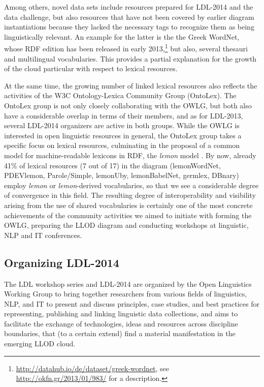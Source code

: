 Among others, novel data sets include resources prepared for LDL-2014 and the data challenge, but also resources that have not been covered by earlier diagram instantiations because they lacked the necessary tags to recognize them as being linguistically relevant. An example for the latter is the the Greek WordNet, whose RDF edition has been released in early 2013,\footnote{
	\url{http://datahub.io/de/dataset/greek-wordnet}, see \url{http://okfn.gr/2013/01/983/} for a description.
}
but also, several thesauri and multilingual vocabularies.
This provides a partial explanation for the growth of the cloud particular with respect to lexical resources. 

At the same time, the growing number of linked lexical resources also reflects the activities of the W3C Ontology-Lexica Community Group (OntoLex). The OntoLex group is not only closely collaborating with the OWLG, but both also have a considerable overlap in terms of their members, and as for LDL-2013, several LDL-2014 organizers are active in both groups.
While the OWLG is interested in open linguistic resources in general, the OntoLex group takes a specific focus on lexical resources, culminating in the proposal of a common model for machine-readable lexicons in RDF, the \emph{lemon} model \cite{mccrae2012integrating}. 
By now, already 41\% of lexical resources (7 out of 17) in the diagram (lemonWordNet, PDEVlemon, Parole/Simple, lemonUby, lemonBabelNet, germlex, DBnary) employ \emph{lemon} or \emph{lemon}-derived vocabularies, so that we see a considerable degree of convergence in this field. 
The resulting degree of interoperability and visibility arising from the use of shared vocabularies is certainly one of the most concrete achievements of the community activities we aimed to initiate with forming the OWLG, preparing the LLOD diagram and conducting workshops at linguistic, NLP and IT conferences.

\subsection{Organizing LDL-2014}

The LDL workshop series and LDL-2014 are organized by the Open Linguistics Working Group 
to bring together researchers from various fields of linguistics, NLP, and IT to present and discuss principles, case studies, and best practices for representing, publishing and linking linguistic data collections, and aims to facilitate the exchange of technologies, ideas and resources across discipline boundaries, that (to a certain extend) find a material manifestation in the emerging LLOD cloud.

